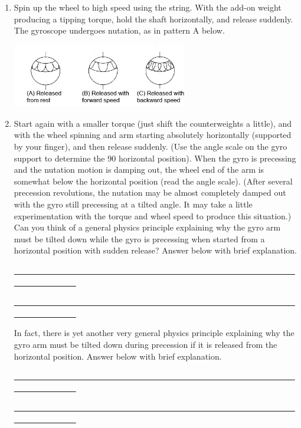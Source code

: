 \begin{enumerate}[label=\arabic*.]

\item Spin up the wheel to high speed using the string.  With the add-on weight producing a tipping torque, hold the shaft horizontally, and release suddenly.  The gyroscope undergoes nutation, as in pattern A below.
\begin{center} \includegraphics*[width=0.6\textwidth]{imgs/6labs/6Alab/6Aexp7/6a-exp7-fig17_fix2.jpg} \end{center}

\item Start again with a smaller torque (just shift the counterweights a little), and with the wheel spinning and arm starting absolutely horizontally (supported by your finger), and then release suddenly.  (Use the angle scale on the gyro support to determine the 90{\degree} horizontal position).  When the gyro is precessing and the nutation motion is damping out, the wheel end of the arm is somewhat below the horizontal position (read the angle scale).  (After several precession revolutions, the nutation may be almost completely damped out with the gyro still precessing at a tilted angle.  It may take a little experimentation with the torque and wheel speed to produce this situation.)  Can you think of a general physics principle explaining why the gyro arm must be tilted down while the gyro is precessing when started from a horizontal position with sudden release?  Answer below with brief explanation.

\ul{~~~~~~~~~~~~~~~~~~~~~~~~~~~~~~~~~~~~~~~~~~~~~~~~~~~~~~~~~~~~~~~~~~~~~~~~~~~~~~~~~~~}

\ul{~~~~~~~~~~~~~~~~~~~~~~~~~~~~~~~~~~~~~~~~~~~~~~~~~~~~~~~~~~~~~~~~~~~~~~~~~~~~~~~~~~~}

In fact, there is yet another very general physics principle explaining why the gyro arm must be tilted down during precession if it is released from the horizontal position.  Answer below with brief explanation.

\ul{~~~~~~~~~~~~~~~~~~~~~~~~~~~~~~~~~~~~~~~~~~~~~~~~~~~~~~~~~~~~~~~~~~~~~~~~~~~~~~~~~~~}

\ul{~~~~~~~~~~~~~~~~~~~~~~~~~~~~~~~~~~~~~~~~~~~~~~~~~~~~~~~~~~~~~~~~~~~~~~~~~~~~~~~~~~~}

\end{enumerate}


